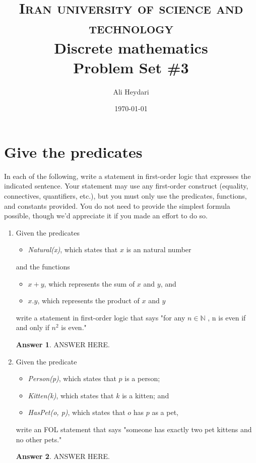 \documentclass[a4paper]{article}
\title{
\textsc{Iran university of science and technology} \\ [25pt] %
Discrete mathematics\\Problem Set \#3 \\
}
\author{Ali Heydari}
\date{\today}
\renewcommand{\(}{\left(}
\renewcommand{\)}{\right)}
\theoremstyle{plain}
\theoremstyle{plain}
\theoremstyle{definition}
\newtheorem*{answer}{Answer}
\begin{document}
\maketitle

\section{Give the predicates}
In each of the following, write a statement in first-order logic that expresses the indicated sentence. Your statement may use any first-order construct (equality, connectives, quantifiers, etc.), but you must only use the predicates, functions, and constants provided. You do not need to provide the simplest formula possible, though we'd appreciate it if you made an effort to do so.
\begin{enumerate}[label*=\roman*.,ref=\roman*]

\item Given the predicates
\begin{itemize}
\item[] \textit{Natural(x)}, which states that $x$ is an natural number
\end{itemize}
and the functions
\begin{itemize}
\item[] $x + y$, which represents the sum of $x$ and $y$, and
\item[] $x . y $, which represents the product of $x$ and $y$
\end{itemize}

write a statement in first-order logic that says "for any $n \in \mathds{N} $ , n is even if and only if $n^2$ is even."
\begin{shaded}
\begin{answer}
ANSWER HERE.
\end{answer}
\end{shaded}

\item Given the predicate
\begin{itemize}
  \item[] \textit{Person(p)}, which states that $p$ is a person;
  \item[] \textit{Kitten(k)}, which states that $k$ is a kitten; and
  \item[] \textit{HasPet(o, p)}, which states that $o$ has $p$ as a pet,
\end{itemize}
write an FOL statement that says "someone has exactly two pet kittens and no other pets."
\begin{shaded}
\begin{answer}
ANSWER HERE.
\end{answer}
\end{shaded}


\end{enumerate}
\end{document}
